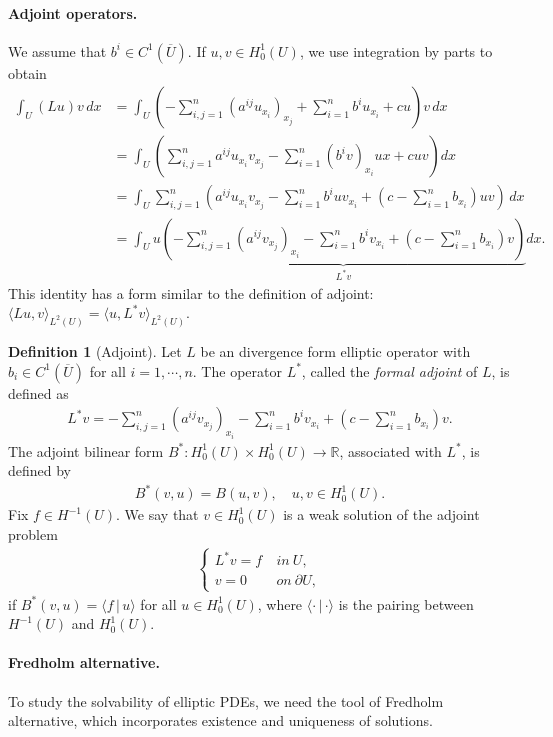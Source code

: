 \documentclass{article}
\numberwithin{equation}{section}
\newcommand{\bbR}{\mathbb{R}}
\newcommand{\ol}{\overline}
\theoremstyle{plain}
\theoremstyle{definition}
\newtheorem{definition}[theorem]{Definition}
\begin{document}
\paragraph{Adjoint operators.} We assume that $b^i\in C^1(\ol{U})$. If $u,v\in H_0^1(U)$, we use integration by parts to obtain
\begin{align*}
	\int_U (Lu) v\,dx &=\int_U\left(-\sum_{i,j=1}^n\left(a^{ij}u_{x_i}\right)_{x_j}+\sum_{i=1}^n b^iu_{x_i}+cu\right)v\,dx\\
	&=\int_{U}\left(\sum_{i,j=1}^n a^{ij}u_{x_i}v_{x_j}-\sum_{i=1}^n (b^iv)_{x_i}ux+ cuv\right)dx\\
	&=\int_{U}\sum_{i,j=1}^n\left(a^{ij}u_{x_i}v_{x_j}-\sum_{i=1}^n b^iuv_{x_i} +\left(c-\sum_{i=1}^n b_{x_i}\right)uv\right)\,dx\\
	&=\int_U u\underbrace{\left(-\sum_{i,j=1}^n(a^{ij}v_{x_j})_{x_i}-\sum_{i=1}^n b^iv_{x_i}+\left(c-\sum_{i=1}^n b_{x_i}\right)v\right)}_{L^*v}dx.
\end{align*}
This identity has a form similar to the definition of adjoint: $\langle Lu,v\rangle_{L^2(U)}=\langle u,L^*v\rangle_{L^2(U)}$.

\begin{definition}[Adjoint]
Let $L$ be an divergence form elliptic operator with $b_i\in C^1(\ol{U})$ for all $i=1,\cdots,n$. The operator $L^*$, called the \textit{formal adjoint} of $L$, is defined as
\begin{align*}
	L^*v=-\sum_{i,j=1}^n(a^{ij}v_{x_j})_{x_i}-\sum_{i=1}^n b^iv_{x_i}+\left(c-\sum_{i=1}^n b_{x_i}\right)v.
\end{align*}
The adjoint bilinear form $B^*:H_0^1(U)\times H_0^1(U)\to \bbR$, associated with $L^*$, is defined by
\begin{align*}
	B^*(v,u)=B(u,v),\quad u,v\in H_0^1(U).
\end{align*}
Fix $f\in H^{-1}(U)$. We say that $v\in H_0^1(U)$  is a weak solution of the adjoint problem
\begin{align*}
\begin{cases}
	L^*v=f\ &in\ U,\\
	v=0\ &on\ \partial U,
\end{cases}
\end{align*}
if $B^*(v,u)=\langle f\,|\,u\rangle$ for all $u\in H_0^1(U)$, where $\langle\cdot\,|\,\cdot\rangle$ is the pairing between $H^{-1}(U)$ and $H^1_0(U)$.
\end{definition}

\paragraph{Fredholm alternative.} To study the solvability of elliptic PDEs, we need the tool of Fredholm alternative, which incorporates existence and uniqueness of solutions.
\end{document}
